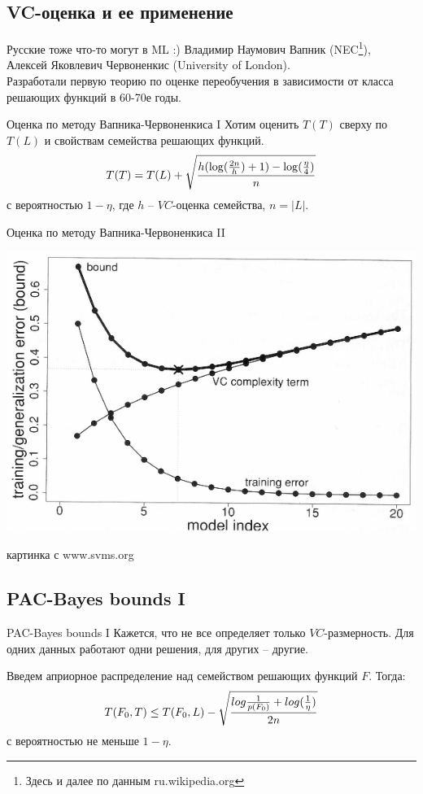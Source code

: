 \documentclass[14pt, fleqn, xcolor={dvipsnames, table}]{beamer}
\begin{document}
\subsection{VC-оценка и ее применение}
\begin{frame}{Русские тоже что-то могут в ML :)}
Владимир Наумович Вапник (NEC\footnote{Здесь и далее по данным ru.wikipedia.org}), \\
Алексей Яковлевич Червоненкис (University of London). \\
Разработали первую теорию по оценке переобучения в зависимости от класса решающих функций в 60-70е годы.
\end{frame}

\begin{frame}{Оценка по методу Вапника-Червоненкиса I}
Хотим оценить $T(T)$ сверху по $T(L)$ и свойствам семейства решающих функций.\\
$$
T(T) = T(L) + \sqrt{h(\log(\frac{2n}{h})+1)-\log(\frac{\eta}{4})\over n}
$$
с вероятностью $1-\eta$, где $h$ -- $VC$-оценка семейства, $n = |L|$.
\end{frame}

\begin{frame}{Оценка по методу Вапника-Червоненкиса II}
\begin{center}
\includegraphics[height=0.6\textheight]{Herbrich2002_4-4.png}
\end{center}
{\footnotesize картинка с www.svms.org}
\end{frame}

\subsection{PAC-Bayes bounds I}
\begin{frame}{PAC-Bayes bounds I}
\small
Кажется, что не все определяет только $VC$-размерность. Для одних данных работают одни решения, для других -- другие. \\
\begin{definition}
Введем априорное распределение над семейством решающих функций $F$. Тогда:
$$
T(F_0, T) \le T(F_0, L) - \sqrt{log \frac{1}{p(F_0)} + log(\frac{1}{\eta}) \over 2n}
$$
с вероятностью не меньше $1-\eta$.
\end{definition}
\end{frame}
\end{document}
